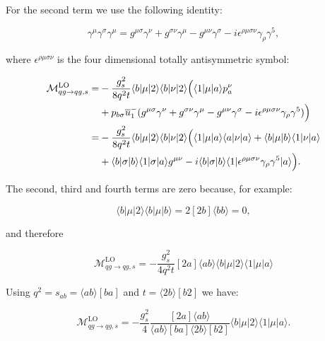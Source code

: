 			For the second term we use the following identity:

			\begin{equation}
				\gamma^\mu\gamma^\sigma\gamma^\mu=g^{\mu\sigma}\gamma^\nu + g^{\sigma\nu}\gamma^\mu
				- g^{\mu\nu}\gamma^\sigma - i\epsilon^{\rho\mu\sigma\nu}\gamma_\rho\gamma^5,
			\end{equation}

			where $\epsilon^{\rho\mu\sigma\nu}$ is the four dimensional totally antisymmetric symbol:

			\begin{align}
			\begin{split}
				\mathcal{M}_{qg\rightarrow qg, s}^{\text{LO}} = &-\frac{g^2_s}{8q^2t} \langle b | \mu | 2 \rangle \langle b | \nu | 2 \rangle \Big(\langle 1 | \mu | a \rangle p_a^\nu \\
				&+ p_{b\sigma}\overline{u}^-_1(g^{\mu\sigma}\gamma^\nu + g^{\sigma\nu}\gamma^\mu
				- g^{\mu\nu}\gamma^\sigma - i\epsilon^{\rho\mu\sigma\nu}\gamma_\rho\gamma^5)\Big)\\
				= &-\frac{g^2_s}{8q^2t}\langle{b}|\mu|2\rangle\langle{b}|\nu|2\rangle
				\Big(\langle 1|\mu|a\rangle \langle a|\nu|a\rangle + \langle b|\mu|b\rangle
				\langle 1|\nu|a\rangle \\
				&+ \langle b|\sigma|b\rangle\langle1|\sigma|a\rangle
				g^{\mu\nu} - i\langle b|\sigma|b\rangle\langle 1|\epsilon^{\rho\mu\sigma\nu}\gamma_\rho\gamma^5|a\rangle\Big).
			\end{split}
			\end{align}

			The second, third and fourth terms are zero because, for example:

			\begin{equation}
				\langle b|\mu|2\rangle\langle b|\mu|b\rangle = 2[2b]\langle b b\rangle = 0,
			\end{equation}

			and therefore

			\begin{equation}
				\mathcal{M}_{qg\rightarrow qg, s}^{\text{LO}}=-\frac{g^2_s}{4q^2t}[2a]\langle ab\rangle\langle{b}|\mu|2\rangle\langle{1}|\mu|a\rangle
			\end{equation}

			Using $q^2=s_{ab}=\langle ab\rangle[ba]$ and $t=\langle2b\rangle[b2]$ we have:

			\begin{equation}
			\mathcal{M}_{qg\rightarrow qg, s}^{\text{LO}}=-\frac{g^2_s}{4}\frac{[2a]\langle ab\rangle}{\langle ab\rangle[ba]
			\langle2b\rangle[b2]}\langle{b}|\mu|2\rangle\langle{1}|\mu|a\rangle.
			\end{equation}

